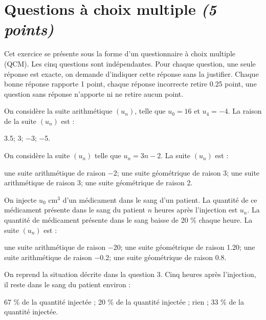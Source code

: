 \section{Questions à choix multiple \textit{(5 points)}}

Cet exercice se présente sous la forme d'un questionnaire à choix multiple (QCM). Les cinq questions sont indépendantes. Pour chaque question, une seule réponse est exacte, on demande d'indiquer cette réponse sans la justifier. Chaque bonne réponse rapporte 1 point, chaque réponse incorrecte retire \num{0.25} point, une question sans réponse n'apporte ni ne retire aucun point.

\begin{questions}
	\question[1] On considère la suite arithmétique $(u_n)$, telle que $u_0 = 16$ et $u_4 = -4$. La raison de la suite $(u_n)$ est :
	
	\begin{oneparcheckboxes}
		\choice \num{3.5};
		\choice \num{3};
		\choice \num{-3};
		\CorrectChoice \num{-5}.
	\end{oneparcheckboxes} 

	\question[1] On considère la suite $(u_n)$ telle que $u_n = 3n - 2$. La suite $(u_n)$ est :
	
	\begin{checkboxes}
		\choice une suite arithmétique de raison \num{-2};
		\choice une suite géométrique de raison \num{3};
		\correctchoice une suite arithmétique de raison \num{3};
		\choice une suite géométrique de raison \num{2}.
	\end{checkboxes}

	\question[1] On injecte $u_0$ cm$^3$ d'un médicament dans le sang d'un patient. La quantité de ce médicament présente dans le sang du patient $n$ heures après l'injection est $u_n$. La quantité de médicament présente dans le sang baisse de 20 \% chaque heure.
	La suite $(u_n)$ est :
	
	\begin{checkboxes}
		\choice une suite arithmétique de raison \num{-20};
		\choice une suite géométrique de raison \num{1.20};
		\choice une suite arithmétique de raison \num{-0.2};
		\correctchoice une suite géométrique de raison \num{0.8}.
	\end{checkboxes}

	\question[1] On reprend la situation décrite dans la question 3. Cinq heures après l'injection, il reste dans le sang du patient environ :
	
	\begin{checkboxes}
		\choice \num{67} \% de la quantité injectée ;
		\choice \num{20} \% de la quantité injectée ;
		\choice rien ;
		\CorrectChoice \num{33} \% de la quantité injectée.
	\end{checkboxes}


\end{questions}
